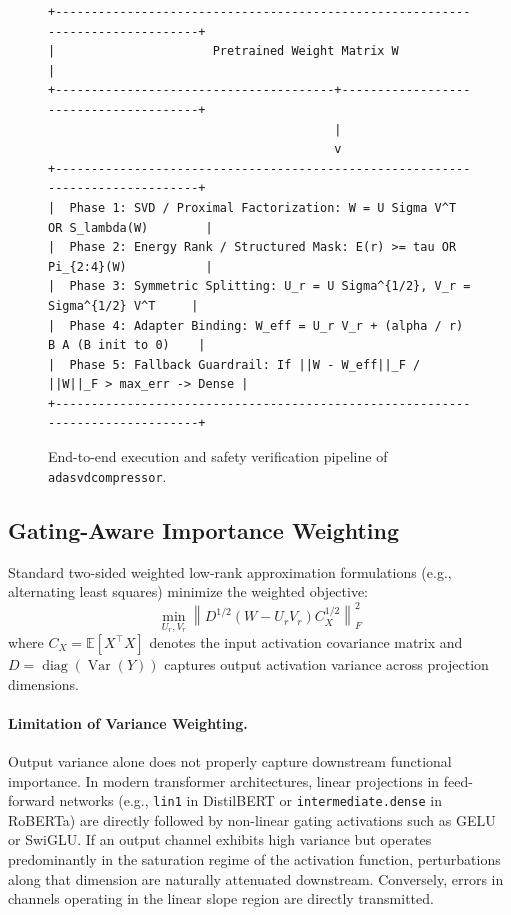 \documentclass{article}
\begin{document}
\begin{figure}[t]
\centering
\begin{verbatim}
+-------------------------------------------------------------------------------+
|                      Pretrained Weight Matrix W                               |
+---------------------------------------+---------------------------------------+
                                        |
                                        v
+-------------------------------------------------------------------------------+
|  Phase 1: SVD / Proximal Factorization: W = U Sigma V^T OR S_lambda(W)        |
|  Phase 2: Energy Rank / Structured Mask: E(r) >= tau OR Pi_{2:4}(W)           |
|  Phase 3: Symmetric Splitting: U_r = U Sigma^{1/2}, V_r = Sigma^{1/2} V^T     |
|  Phase 4: Adapter Binding: W_eff = U_r V_r + (alpha / r) B A (B init to 0)    |
|  Phase 5: Fallback Guardrail: If ||W - W_eff||_F / ||W||_F > max_err -> Dense |
+-------------------------------------------------------------------------------+
\end{verbatim}
\caption{End-to-end execution and safety verification pipeline of \texttt{adasvdcompressor}.}
\end{figure}

\subsection{Gating-Aware Importance Weighting}
\label{sec:gating_aware_d}
Standard two-sided weighted low-rank approximation formulations (e.g., alternating least squares) minimize the weighted objective:
\begin{equation}
\min_{U_r, V_r} \left\| D^{1/2} (W - U_r V_r) C_X^{1/2} \right\|_F^2
\end{equation}
where $C_X = \mathbb{E}[X^\top X]$ denotes the input activation covariance matrix and $D = \operatorname{diag}(\operatorname{Var}(Y))$ captures output activation variance across projection dimensions.

\paragraph{Limitation of Variance Weighting.}
Output variance alone does not properly capture downstream functional importance. In modern transformer architectures, linear projections in feed-forward networks (e.g., \texttt{lin1} in DistilBERT or \texttt{intermediate.dense} in RoBERTa) are directly followed by non-linear gating activations such as GELU or SwiGLU. If an output channel exhibits high variance but operates predominantly in the saturation regime of the activation function, perturbations along that dimension are naturally attenuated downstream. Conversely, errors in channels operating in the linear slope region are directly transmitted.
\end{document}

